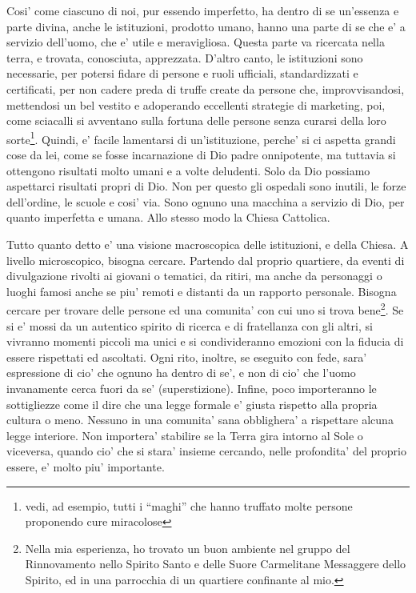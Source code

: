 Cosi' come ciascuno di noi, pur essendo imperfetto, ha dentro di se un'essenza e parte divina, anche le istituzioni, prodotto umano, hanno una parte di se che e' a servizio dell'uomo, che e' utile e meravigliosa. Questa parte va ricercata nella terra, e trovata, conosciuta, apprezzata. 
D'altro canto, le istituzioni sono necessarie, per potersi fidare di persone e ruoli ufficiali, standardizzati e certificati, per non cadere preda di truffe create da persone che, improvvisandosi, mettendosi un bel vestito e adoperando eccellenti strategie di marketing, poi, come sciacalli si avventano sulla fortuna delle persone senza curarsi della loro sorte\footnote{vedi, ad esempio, tutti i ``maghi'' che hanno truffato molte persone proponendo cure miracolose}.
Quindi, e' facile lamentarsi di un'istituzione, perche' si ci aspetta grandi cose da lei, come se fosse incarnazione di Dio padre onnipotente, ma tuttavia si ottengono risultati molto umani e a volte deludenti. 
Solo da Dio possiamo aspettarci risultati propri di Dio.
Non per questo gli ospedali sono inutili, le forze dell'ordine, le scuole e cosi' via. Sono ognuno una macchina a servizio di Dio, per quanto imperfetta e umana. Allo stesso modo la Chiesa Cattolica.

Tutto quanto detto e' una visione macroscopica delle istituzioni, e della Chiesa. A livello microscopico, bisogna cercare. Partendo dal proprio quartiere, da eventi di divulgazione rivolti ai giovani o tematici, da ritiri, ma anche da personaggi o luoghi famosi anche se piu' remoti e distanti da un rapporto personale. Bisogna cercare per trovare delle persone ed una comunita' con cui uno si trova bene\footnote{
    Nella mia esperienza, ho trovato un buon ambiente nel gruppo del Rinnovamento nello Spirito Santo e delle Suore Carmelitane Messaggere dello Spirito, ed in una parrocchia di un quartiere confinante al mio.
}.
Se si e' mossi da un autentico spirito di ricerca e di fratellanza con gli altri, si vivranno momenti piccoli ma unici e si condivideranno emozioni con la fiducia di essere rispettati ed ascoltati. Ogni rito, inoltre, se eseguito con fede, sara' espressione di cio' che ognuno ha dentro di se', e non di cio' che l'uomo invanamente cerca fuori da se' (superstizione). Infine, poco importeranno le sottigliezze come il dire che una legge formale e' giusta rispetto alla propria cultura o meno. Nessuno in una comunita' sana obblighera' a rispettare alcuna legge interiore. Non importera' stabilire se la Terra gira intorno al Sole o viceversa, quando cio' che si stara' insieme cercando, nelle profondita' del proprio essere, e' molto piu' importante.

